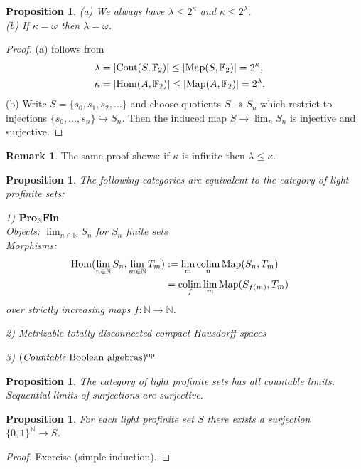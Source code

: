\documentclass[12pt,a4paper]{amsart}
\newtheorem{prop}[PARA]{Proposition}
\theoremstyle{definition}
\newtheorem{rem}[PARA]{Remark}
\theoremstyle{theorem}
\newcommand{\F}{{\mathbb{F}}}
\newcommand{\N}{{\mathbb{N}}}
\DeclareMathOperator*{\colim}{colim}
\newcommand{\Hom}{\mathrm{Hom}}
\newcommand{\om}{{\omega}}
\newcommand{\into}{\hookrightarrow}
\newcommand{\Cont}{{\rm Cont}}
\newcommand{\Map}{{\rm Map}}
\begin{document}
\begin{prop}
(a) We always have $\lambda\leq 2^\kappa$ and $\kappa\leq 2^\lambda$. \\
(b) If $\kappa=\om$ then $\lambda=\om$. 
\end{prop}

\begin{proof}
(a) follows from
\begin{align*}
  \lambda &= |\Cont(S,\F_2)| \leq |\Map(S,\F_2)| = 2^\kappa, \cr
  \kappa &= |\Hom(A,\F_2)| \leq |\Map(A,\F_2)| = 2^\lambda.
\end{align*}
(b) Write $S=\{s_0,s_1,s_2,\dots\}$ and choose quotients
$S\twoheadrightarrow S_n$ which restrict to injections
$\{s_0,\dots,s_n\}\into S_n$. Then the induced map $S\to\lim_n S_n$ is
injective and surjective.
\end{proof}

\begin{rem}
The same proof shows: if $\kappa$ is infinite then $\lambda\leq\kappa$.
\end{rem}

\begin{prop}
The following categories are equivalent to the category of light
profinite sets:

1) $\text{\bf Pro}_{\N}\text{\bf Fin}$ \\
Objects: $\lim_{n\in\N}S_n$ for $S_n$ finite sets
\\
Morphisms: 
\begin{align*}
  \Hom(\lim_{n\in\N}S_n,\lim_{m\in\N}T_m)
  &:= \lim_m\colim_n\Map(S_n,T_m) \cr
  &= \colim_f\lim_m\Map(S_{f(m)},T_m)
\end{align*}
over strictly increasing maps $f:\N\to\N$.
  
2) {\em Metrizable} totally disconnected compact Hausdorff spaces

3) $(\text{{\em Countable} Boolean algebras})^{\rm op}$
\end{prop}

\begin{prop}
The category of light profinite sets has all countable
limits. Sequential limits of surjections are surjective. 
\end{prop}

\begin{prop}
For each light profinite set $S$ there exists a surjection
$\{0,1\}^\N\to S$. 
\end{prop}

\begin{proof}
Exercise (simple induction).
\end{proof}
\end{document}
